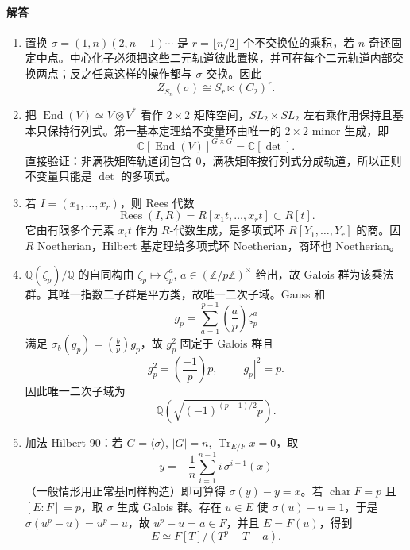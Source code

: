 \documentclass[UTF8,12pt]{ctexart}
\begin{document}
\paragraph{解答}
\begin{enumerate}[label=\textbf{\arabic*.},leftmargin=2.2em]
\item 置换 \(\sigma=(1,n)(2,n-1)\cdots\) 是 \(r=\lfloor n/2\rfloor\) 个不交换位的乘积，若 \(n\) 奇还固定中点。中心化子必须把这些二元轨道彼此置换，并可在每个二元轨道内部交换两点；反之任意这样的操作都与 \(\sigma\) 交换。因此
\[
Z_{S_n}(\sigma)\cong S_r\ltimes (C_2)^r.
\]
\item 把 \(\operatorname{End}(V)\simeq V\otimes V^\ast\) 看作 \(2\times2\) 矩阵空间，\(SL_2\times SL_2\) 左右乘作用保持且基本只保持行列式。第一基本定理给不变量环由唯一的 \(2\times2\) minor 生成，即
\[
\mathbb C[\operatorname{End}(V)]^{G\times G}=\mathbb C[\det].
\]
直接验证：非满秩矩阵轨道闭包含 \(0\)，满秩矩阵按行列式分成轨道，所以正则不变量只能是 \(\det\) 的多项式。
\item 若 \(I=(x_1,\ldots,x_r)\)，则 Rees 代数
\[
\operatorname{Rees}(I,R)=R[x_1t,\ldots,x_rt]\subset R[t].
\]
它由有限多个元素 \(x_it\) 作为 \(R\)-代数生成，是多项式环 \(R[Y_1,\ldots,Y_r]\) 的商。因 \(R\) Noetherian，Hilbert 基定理给多项式环 Noetherian，商环也 Noetherian。
\item \(\mathbb Q(\zeta_p)/\mathbb Q\) 的自同构由 \(\zeta_p\mapsto \zeta_p^a\), \(a\in(\mathbb Z/p\mathbb Z)^\times\) 给出，故 Galois 群为该乘法群。其唯一指数二子群是平方类，故唯一二次子域。Gauss 和
\[
g_p=\sum_{a=1}^{p-1}\left(\frac ap\right)\zeta_p^a
\]
满足 \(\sigma_b(g_p)=\left(\frac bp\right)g_p\)，故 \(g_p^2\) 固定于 Galois 群且
\[
g_p^2=\left(\frac{-1}{p}\right)p,\qquad |g_p|^2=p.
\]
因此唯一二次子域为
\[
\mathbb Q\left(\sqrt{(-1)^{(p-1)/2}p}\right).
\]
\item 加法 Hilbert 90：若 \(G=\langle\sigma\rangle\), \(|G|=n\), \(\operatorname{Tr}_{E/F}x=0\)，取
\[
y=-\frac1n\sum_{i=1}^{n-1} i\,\sigma^{i-1}(x)
\]
（一般情形用正常基同样构造）即可算得 \(\sigma(y)-y=x\)。若 \(\operatorname{char}F=p\) 且 \([E:F]=p\)，取 \(\sigma\) 生成 Galois 群。存在 \(u\in E\) 使 \(\sigma(u)-u=1\)，于是 \(\sigma(u^p-u)=u^p-u\)，故 \(u^p-u=a\in F\)，并且 \(E=F(u)\)，得到
\[
E\simeq F[T]/(T^p-T-a).
\]
\end{enumerate}
\end{document}
